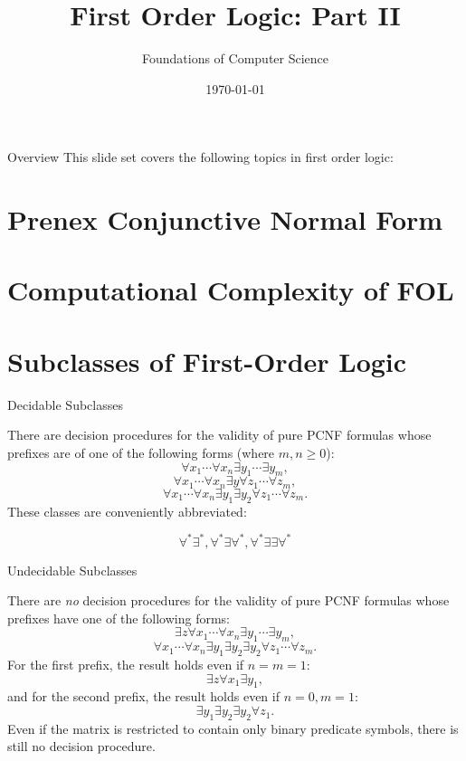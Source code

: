 \documentclass[style=sailor,size=12pt]{powerdot}
\title{First Order Logic: Part II}
\author{Foundations of Computer Science}
\date{\today}
\begin{document}
\maketitle
\begin{slide}[toc=,bm=]{Overview}
This slide set covers the following topics in first order logic:

\vspace{5mm}
\tableofcontents[content=sections]
\end{slide}

\section[]{Prenex Conjunctive Normal Form}


\section[]{Computational Complexity of FOL}


\section[]{Subclasses of First-Order Logic}
\begin{slide}[bm=,toc=]{Decidable Subclasses}
\begin{thm}{12.5}
There are decision procedures for the validity of pure PCNF formulas whose
prefixes are of one of the following forms (where $m,n \geq 0$):
\[ \forall x_1\cdots \forall x_n \exists y_1 \cdots \exists y_m, \]
\[ \forall x_1\cdots \forall x_n \exists y \forall z_1 \cdots \forall z_m, \]
\[ \forall x_1\cdots \forall x_n \exists y_1 \exists y_2 \forall z_1 \cdots \forall z_m. \]
\pause
These classes are conveniently abbreviated: 

\[    \forall^*\exists^*, \forall^*\exists \forall^*,   \forall^*\exists \exists \forall^*\]
\end{thm}
\end{slide}

\begin{wideslide}[bm=,toc=]{Undecidable Subclasses}
\begin{thm}{12.6}
There are \emph{no} decision procedures for the validity of pure PCNF formulas whose
prefixes have one of the following forms:
\[ \exists z \forall x_1\cdots \forall x_n \exists y_1 \cdots \exists y_m, \]
\[ \forall x_1\cdots \forall x_n \exists y_1 \exists y_2 \exists y_2 \forall z_1 \cdots \forall z_m. \]
\pause
For the first prefix, the result holds even if $n = m = 1$:
\pause
\[ \exists z \forall x_1 \exists y_1, \]
\pause
and for the second prefix, the result holds even if $n = 0, m = 1$:
\pause
\[ \exists y_1 \exists y_2 \exists y_2 \forall z_1. \]
\pause
Even if the matrix is restricted to contain only binary predicate symbols, there
is still no decision procedure.
\end{thm}
\end{wideslide}
\end{document}
